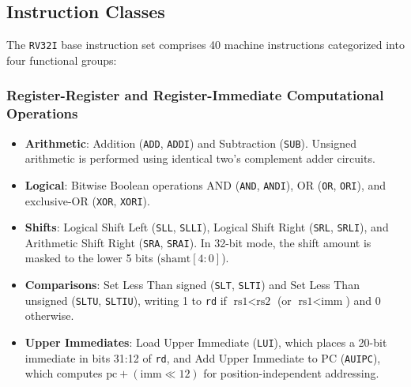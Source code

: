 \subsection{Instruction Classes}

The \texttt{RV32I} base instruction set comprises 40 machine instructions categorized into four functional groups:

\subsubsection{Register-Register and Register-Immediate Computational Operations}
\begin{itemize}
    \item \textbf{Arithmetic}: Addition (\texttt{ADD}, \texttt{ADDI}) and Subtraction (\texttt{SUB}). Unsigned arithmetic is performed using identical two's complement adder circuits.
    \item \textbf{Logical}: Bitwise Boolean operations AND (\texttt{AND}, \texttt{ANDI}), OR (\texttt{OR}, \texttt{ORI}), and exclusive-OR (\texttt{XOR}, \texttt{XORI}).
    \item \textbf{Shifts}: Logical Shift Left (\texttt{SLL}, \texttt{SLLI}), Logical Shift Right (\texttt{SRL}, \texttt{SRLI}), and Arithmetic Shift Right (\texttt{SRA}, \texttt{SRAI}). In 32-bit mode, the shift amount is masked to the lower 5 bits ($\text{shamt}[4:0]$).
    \item \textbf{Comparisons}: Set Less Than signed (\texttt{SLT}, \texttt{SLTI}) and Set Less Than unsigned (\texttt{SLTU}, \texttt{SLTIU}), writing 1 to \texttt{rd} if $\text{rs1} < \text{rs2}$ (or $\text{rs1} < \text{imm}$) and 0 otherwise.
    \item \textbf{Upper Immediates}: Load Upper Immediate (\texttt{LUI}), which places a 20-bit immediate in bits 31:12 of \texttt{rd}, and Add Upper Immediate to PC (\texttt{AUIPC}), which computes $\text{pc} + (\text{imm} \ll 12)$ for position-independent addressing.
\end{itemize}

